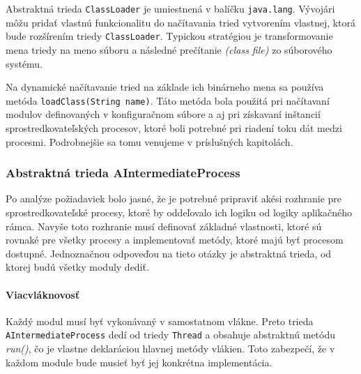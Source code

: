 Abstraktná trieda \verb|ClassLoader| je umiestnená v balíčku \verb|java.lang|. Vývojári môžu pridať 
vlastnú 
funkcionalitu do načítavania tried vytvorením vlastnej, ktorá bude rozšírením triedy 
\verb|ClassLoader|. Typickou stratégiou je transformovanie mena triedy na meno súboru a následné 
prečítanie  \emph{(class file)} zo súborového systému. \citep{christudas, classloader}

Na dynamické načítavanie tried na základe ich binárneho mena sa používa metóda \verb|loadClass(String name)|.
Táto metóda bola použitá pri načítavaní modulov definovaných v konfiguračnom súbore a aj pri získavaní 
inštancií sprostredkovateľských procesov, ktoré boli potrebné pri riadení toku dát medzi procesmi.
Podrobnejšie sa tomu venujeme v príslušných kapitolách. 



\subsubsection{Abstraktná trieda AIntermediateProcess} 

Po analýze požiadaviek bolo jasné, že je potrebné pripraviť akési rozhranie pre sprostredkovateľské 
procesy, ktoré by oddeľovalo ich logiku od logiky aplikačného rámca. Navyše toto rozhranie musí 
definovať základné vlastnosti, ktoré sú rovnaké pre všetky procesy a implementovať metódy, ktoré 
majú byť procesom dostupné. Jednoznačnou odpoveďou na tieto otázky je abstraktná trieda, 
od ktorej budú všetky moduly dediť. 


\paragraph{Viacvláknovosť}
Každý modul musí byť vykonávaný v samostatnom vlákne. Preto trieda \verb|AIntermediateProcess| dedí
od triedy \verb|Thread| a obsahuje abstraktnú metódu \emph{run()}, čo je vlastne deklaráciou 
hlavnej metódy vlákien. Toto zabezpečí, že v každom module bude musieť byť jej konkrétna implementácia.


